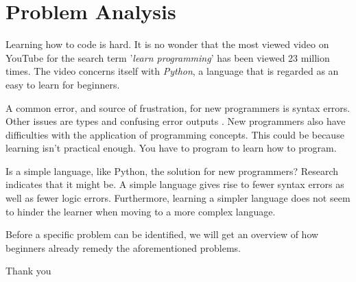 \chapter{Problem Analysis} \label{chap:analysis}
Learning how to code is hard.
It is no wonder that the most viewed video on YouTube for the search term '\textit{learn programming}' has been viewed 23 million times\cite{LearnProgrammingYouTube}.
The video concerns itself with \textit{Python}, a language that is regarded as an easy to learn for beginners\cite{PythonBeginners}.

A common error, and source of frustration, for new programmers is syntax errors.
Other issues are types and confusing error outputs \cite{bosseWhyProgrammingDifficult2017}.
New programmers also have difficulties with the application of programming concepts.
This could be because learning isn't practical enough\cite{lahtinenStudyDifficultiesNovice2005}.
You have to program to learn how to program.

Is a simple language, like Python\cite{WhatPythonExecutive}, the solution for new programmers?
Research indicates that it might be. A simple language gives rise to fewer syntax errors as well as fewer logic errors.
Furthermore, learning a simpler language does not seem to hinder the learner when moving to a more complex language\cite{mannilaWhatSimpleLanguage2006}.

Before a specific problem can be identified, we will get an overview of how beginners already remedy the aforementioned problems.



Thank you